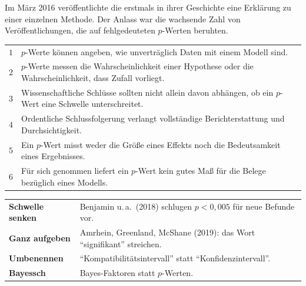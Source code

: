 \begin{forschung}
Im März 2016 veröffentlichte die  erstmals in ihrer Geschichte eine Erklärung zu einer einzelnen Methode. Der Anlass war die wachsende Zahl von Veröffentlichungen, die auf fehlgedeuteten $p$-Werten beruhten.

\begin{center}
{\small
\renewcommand{\arraystretch}{1.45}
\begin{tabular}{@{}P{0.7cm}P{7.6cm}@{}}
\toprule
$1$ & $p$-Werte können angeben, wie unverträglich Daten mit einem Modell sind.\\
$2$ & $p$-Werte messen  die Wahrscheinlichkeit einer Hypothese oder die Wahrscheinlichkeit, dass Zufall vorliegt.\\
$3$ & Wissenschaftliche Schlüsse sollten nicht allein davon abhängen, ob ein $p$-Wert eine Schwelle unterschreitet.\\
$4$ & Ordentliche Schlussfolgerung verlangt vollständige Berichterstattung und Durchsichtigkeit.\\
$5$ & Ein $p$-Wert misst weder die Größe eines Effekts noch die Bedeutsamkeit eines Ergebnisses.\\
$6$ & Für sich genommen liefert ein $p$-Wert kein gutes Maß für die Belege bezüglich eines Modells.\\
\bottomrule
\end{tabular}}
\end{center}

\begin{center}
{\small
\renewcommand{\arraystretch}{1.45}
\begin{tabular}{@{}P{2.4cm}P{5.8cm}@{}}
\toprule
\textbf{Schwelle senken} & Benjamin u.\,a.\ (2018) schlugen $p < 0{,}005$ für neue Befunde vor.\\
\textbf{Ganz aufgeben} & Amrhein, Greenland, McShane (2019): das Wort \enquote{signifikant} streichen.\\
\textbf{Umbenennen} & \enquote{Kompatibilitätsintervall} statt \enquote{Konfidenzintervall}.\\
\textbf{Bayessch} & Bayes-Faktoren statt $p$-Werten.\\
\bottomrule
\end{tabular}}
\end{center}

\begin{center}
\begin{minipage}{0.88\textwidth}
\end{minipage}
\end{center}
\end{forschung}


